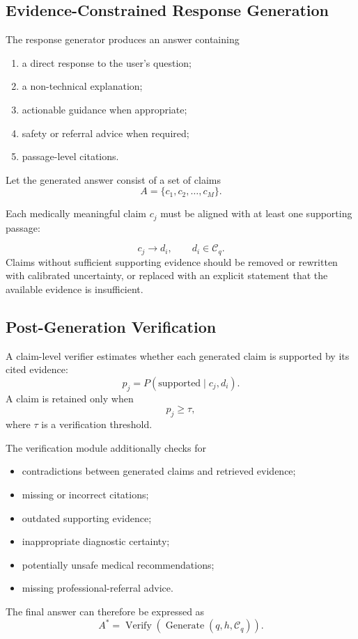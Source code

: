 \documentclass{article}
\begin{document}
\subsection{Evidence-Constrained Response Generation}
The response generator produces an answer containing
\begin{enumerate}
    \item a direct response to the user's question;
    \item a non-technical explanation;
    \item actionable guidance when appropriate;
    \item safety or referral advice when required;
    \item passage-level citations.
\end{enumerate}

Let the generated answer consist of a set of claims
\begin{equation}
    A = \{c_1,c_2,\ldots,c_M\}.
\end{equation}

Each medically meaningful claim $c_j$ must be aligned with at least one 
supporting passage:

\begin{equation}
    c_j \rightarrow d_i,
    \qquad d_i \in \mathcal{C}_q.
\end{equation}
Claims without sufficient supporting evidence should be removed or rewritten with calibrated uncertainty, or replaced with an explicit statement that the available evidence is insufficient.

\subsection{Post-Generation Verification}
A claim-level verifier estimates whether each generated claim is supported by its cited evidence:
\begin{equation}
    p_j =
    P
    \left(
    \mathrm{supported}
    \mid
    c_j,d_i
    \right).
\end{equation}
A claim is retained only when
\begin{equation}
    p_j \geq \tau,
\end{equation}
where $\tau$ is a verification threshold.

The verification module additionally checks for
\begin{itemize}
    \item contradictions between generated claims and retrieved evidence;
    \item missing or incorrect citations;
    \item outdated supporting evidence;
    \item inappropriate diagnostic certainty;
    \item potentially unsafe medical recommendations;
    \item missing professional-referral advice.
\end{itemize}
The final answer can therefore be expressed as
\begin{equation}
    A^{*}
    =
    \operatorname{Verify}
    \left(
    \operatorname{Generate}
    (q,h,\mathcal{C}_q)
    \right).
\end{equation}
\end{document}
